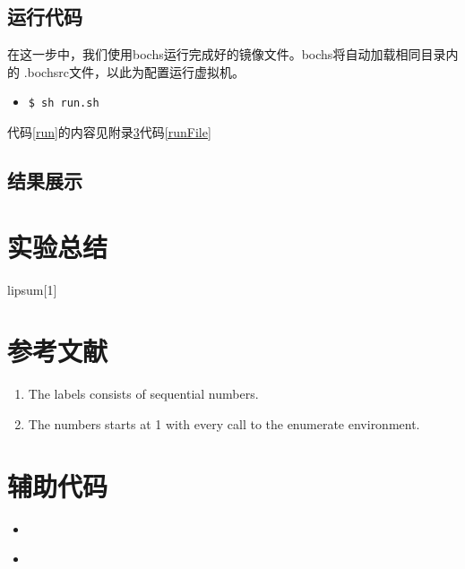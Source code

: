 \documentclass[a4paper]{article}
\newcommand{\shfilescript}[3]{
\begin{itemize}
\item[]
\end{itemize}
}
\begin{document}
    \subsection{运行代码}
    在这一步中，我们使用bochs运行完成好的镜像文件。bochs将自动加载相同目录内的
    .bochsrc文件，以此为配置运行虚拟机。
    \begin{itemize}
        \item[] \begin{lstlisting}[label=run, caption=运行方法]
$ sh run.sh
        \end{lstlisting}
    \end{itemize}
    
    代码\ref{run}的内容见附录\ref{utilitycode}代码\ref{runFile}

    \subsection{结果展示}
    \lipsum[2]
    
\section{实验总结}
lipsum[1]
\begin{appendices}
\section{参考文献}
\label{reference}
\begin{enumerate}
    \item The labels consists of sequential numbers.
    \item The numbers starts at 1 with every call to the enumerate environment.
  \end{enumerate}
    \section{辅助代码}
    \label{utilitycode}
    \shfilescript{buildFile}{build.sh文件内容}{../build.sh}
    \shfilescript{runFile}{run.sh文件内容}{../run.sh}
\end{appendices}
\end{document}
